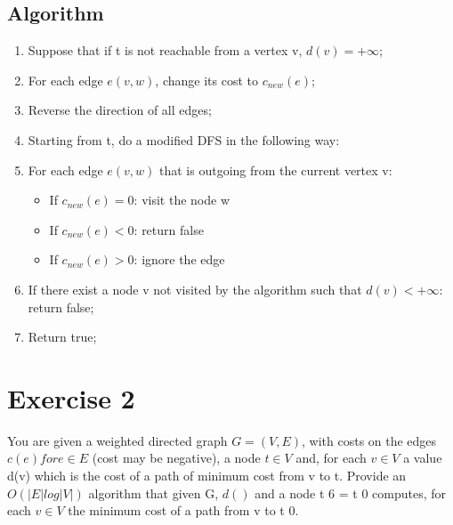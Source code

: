 \documentclass[]{article}
\begin{document}
\subsection{Algorithm}

\begin{enumerate}

\item Suppose that if t is not reachable from a vertex v, $ d(v) = + \infty$;
\item For each edge $e(v,w)$, change its cost to $ c_{new}(e) $;

\item Reverse the direction of all edges;

\item Starting from t, do a modified DFS in the following way:

\item For each edge $e(v,w)$ that is outgoing from the current vertex v:

\begin{itemize}


\item If $c_{new}(e) = 0$: visit the node w
\item If $c_{new}(e) < 0$: return false
\item If $c_{new}(e) > 0$: ignore the edge

\end{itemize}
 
\item If there exist a node v not visited by the algorithm such that $d(v) < +\infty$: return false;
\item Return true;


\end{enumerate}


\section{Exercise 2}

You are given a weighted directed graph $G = (V, E)$, with costs on the edges $c(e) for e ∈ E$ (cost may
be negative), a node $t ∈ V$ and, for each $v ∈ V$ a value d(v) which is the cost of a path of minimum cost
from v to t. Provide an $O(|E| log |V |)$ algorithm that given G, $d()$ and a node t 6 = t 0 computes, for each
$v ∈ V$ the minimum cost of a path from v to t 0. 

\subsection{}
\end{document}
